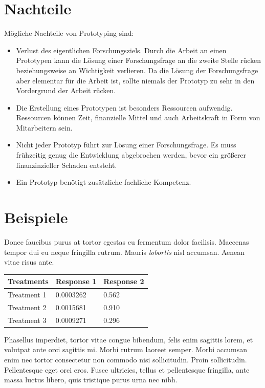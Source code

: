 \documentclass[a0,portrait]{a0poster}
\begin{document}
\begin{multicols}{2}
\section*{Nachteile}
Mögliche Nachteile von Prototyping sind:
\begin{itemize}
    \item Verlust des eigentlichen Forschungsziels. Durch die Arbeit an einen Prototypen kann die Lösung einer Forschungsfrage an die zweite Stelle rücken beziehungsweise an Wichtigkeit verlieren. Da die Lösung der Forschungsfrage aber elementar für die Arbeit ist, sollte niemals der Prototyp zu sehr in den Vordergrund der Arbeit rücken.
    \item Die Erstellung eines Prototypen ist besonders Ressourcen aufwendig. Ressourcen können Zeit, finanzielle Mittel und auch Arbeitskraft in Form von Mitarbeitern sein.
    \item Nicht jeder Prototyp führt zur Lösung einer Forschungsfrage. Es muss frühzeitig genug die Entwicklung abgebrochen werden, bevor ein größerer finanzinzieller Schaden entsteht.
    \item Ein Prototyp benötigt zusätzliche fachliche Kompetenz.
\end{itemize}

\section*{Beispiele}

Donec faucibus purus at tortor egestas eu fermentum dolor facilisis. Maecenas tempor dui eu neque fringilla rutrum. Mauris \emph{lobortis} nisl accumsan. Aenean vitae risus ante.
%
\begin{table} %
\begin{tabular}{l l l}
\toprule
\textbf{Treatments} & \textbf{Response 1} & \textbf{Response 2}\\
\midrule
Treatment 1 & 0.0003262 & 0.562 \\
Treatment 2 & 0.0015681 & 0.910 \\
Treatment 3 & 0.0009271 & 0.296 \\
\bottomrule
\end{tabular}
\end{table}
%
Phasellus imperdiet, tortor vitae congue bibendum, felis enim sagittis lorem, et volutpat ante orci sagittis mi. Morbi rutrum laoreet semper. Morbi accumsan enim nec tortor consectetur non commodo nisi sollicitudin. Proin sollicitudin. Pellentesque eget orci eros. Fusce ultricies, tellus et pellentesque fringilla, ante massa luctus libero, quis tristique purus urna nec nibh.


\end{multicols}
\end{document}
